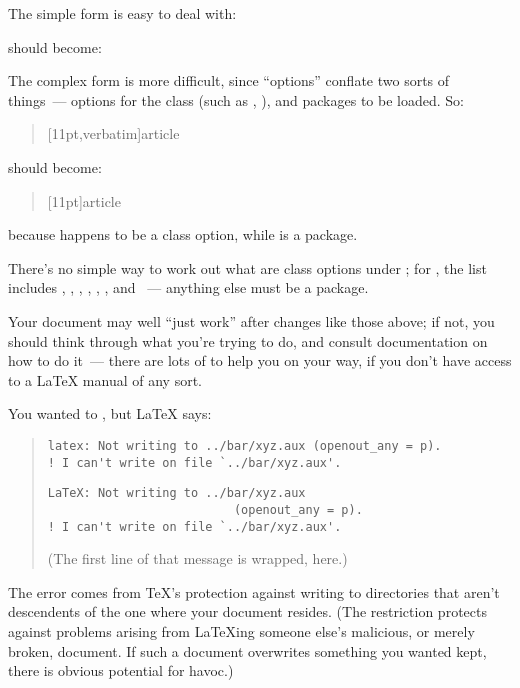 {The simple form is easy to deal with:
\begin{quote}
\end{quote}
should become:
\begin{quote}
\end{quote}
The complex form is more difficult, since \LaTeXo{} ``options''
conflate two sorts of things~--- options for the class (such as
\pkgoption{11pt}, ), and packages to be loaded.
So:
\begin{quote}
  [11pt,verbatim]{article}
\end{quote}
should become:
\begin{quote}
  [11pt]{article}\\
\end{quote}
because \pkgoption{11pt} happens to be a class option, while
 is a package.

There's no simple way to work out what are class options under
\LaTeXo{}; for , the list includes \pkgoption{10pt},
\pkgoption{11pt}, \pkgoption{12pt}, ,
, ,  and
~--- anything else must be a package.

Your document may well ``just work'' after changes like those above;
if not, you should think through what you're trying to do, and consult
documentation on how to do it~--- there are lots of %
 to help you on your way, if you
don't have access to a \LaTeX{} manual of any sort.


You wanted to , but \LaTeX{} says:
\begin{quote}
\begin{wideversion}
\begin{verbatim}
latex: Not writing to ../bar/xyz.aux (openout_any = p).
! I can't write on file `../bar/xyz.aux'.
\end{verbatim}
\end{wideversion}
\begin{narrowversion}
\begin{verbatim}
LaTeX: Not writing to ../bar/xyz.aux
                          (openout_any = p).
! I can't write on file `../bar/xyz.aux'.
\end{verbatim}
(The first line of that message is wrapped, here.)
\end{narrowversion}
\end{quote}
The error comes from \TeX{}'s protection against writing to
directories that aren't descendents of the one where your document
resides.  (The restriction protects against problems arising from
\LaTeX{}ing someone else's malicious, or merely broken, document.  If
such a document overwrites something you wanted kept, there is obvious
potential for havoc.)

}
